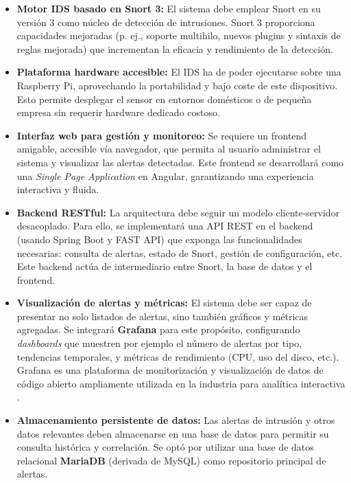 \documentclass[11pt,a4paper,twoside]{report}
\begin{document}
\begin{itemize}
	\item \textbf{Motor IDS basado en Snort 3:} El sistema debe emplear Snort en su versión 3 como núcleo de detección de intrusiones. Snort 3 proporciona capacidades mejoradas (p. ej., soporte multihilo, nuevos plugins y sintaxis de reglas mejorada) que incrementan la eficacia y rendimiento de la detección.
	
	\item \textbf{Plataforma hardware accesible:} El IDS ha de poder ejecutarse sobre una Raspberry Pi, aprovechando la portabilidad y bajo coste de este dispositivo. Esto permite desplegar el sensor en entornos domésticos o de pequeña empresa sin requerir hardware dedicado costoso.
	
	\item \textbf{Interfaz web para gestión y monitoreo:} Se requiere un frontend amigable, accesible vía navegador, que permita al usuario administrar el sistema y visualizar las alertas detectadas. Este frontend se desarrollará como una \emph{Single Page Application} en Angular, garantizando una experiencia interactiva y fluida.
	
	\item \textbf{Backend RESTful:} La arquitectura debe seguir un modelo cliente-servidor desacoplado. Para ello, se implementará una API REST en el backend (usando Spring Boot y FAST API) que exponga las funcionalidades necesarias: consulta de alertas, estado de Snort, gestión de configuración, etc. Este backend actúa de intermediario entre Snort, la base de datos y el frontend.
	
	\item \textbf{Visualización de alertas y métricas:} El sistema debe ser capaz de presentar no solo listados de alertas, sino también gráficos y métricas agregadas. Se integrará \textbf{Grafana} para este propósito, configurando \emph{dashboards} que muestren por ejemplo el número de alertas por tipo, tendencias temporales, y métricas de rendimiento (CPU, uso del disco, etc.). Grafana es una plataforma de monitorización y visualización de datos de código abierto ampliamente utilizada en la industria para analítica interactiva \cite{Grafana}.
	
	\item \textbf{Almacenamiento persistente de datos:} Las alertas de intrusión y otros datos relevantes deben almacenarse en una base de datos para permitir su consulta histórica y correlación. Se optó por utilizar una base de datos relacional \textbf{MariaDB} (derivada de MySQL) como repositorio principal de alertas.
	

\end{itemize}
\end{document}
